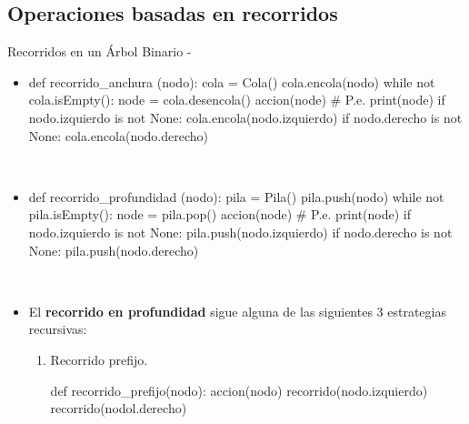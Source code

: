 \documentclass[10pt,envcountsect,spanish]{beamer}
\begin{document}
\subsection{Operaciones basadas en recorridos}



\begin{frame}{Recorridos en un Árbol Binario - }

\begin{itemize}
\item
\hfil\begin{minipage}{.9\textwidth}
\begin{pyverbatim}[][frame=single, fontsize=\footnotesize]
def recorrido_anchura (nodo):
    cola = Cola()
    cola.encola(nodo)
    while not cola.isEmpty():
        node = cola.desencola()
        accion(node) # P.e. print(node)
        if  nodo.izquierdo is not None:
            cola.encola(nodo.izquierdo)
        if nodo.derecho is not None:
            cola.encola(nodo.derecho)
\end{pyverbatim}
\end{minipage}

\

\item 
\hfil\begin{minipage}{.9\textwidth}
\begin{pyverbatim}[][frame=single, fontsize=\footnotesize]
def recorrido_profundidad (nodo):
    pila = Pila()
    pila.push(nodo)
    while not pila.isEmpty():
        node = pila.pop()
        accion(node) # P.e. print(node)
        if  nodo.izquierdo is not None:
            pila.push(nodo.izquierdo)
        if nodo.derecho is not None:
            pila.push(nodo.derecho)
\end{pyverbatim}
\end{minipage}

\

\framebreak

\item El \textbf{recorrido en profundidad} sigue alguna de las siguientes  3 estrategias recursivas:

\begin{enumerate}
\item Recorrido prefijo.


\hfil\begin{minipage}{.6\textwidth}
\begin{pyverbatim}[][frame=single, fontsize=\footnotesize]
def recorrido_prefijo(nodo):
    accion(nodo)
    recorrido(nodo.izquierdo)
    recorrido(nodol.derecho)
\end{pyverbatim}
\end{minipage}


\end{enumerate}
\end{itemize}
\end{frame}
\end{document}
